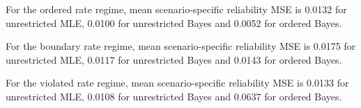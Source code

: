 For the ordered rate regime, mean scenario-specific reliability MSE is 0.0132 for unrestricted MLE, 0.0100 for unrestricted Bayes and 0.0052 for ordered Bayes.

For the boundary rate regime, mean scenario-specific reliability MSE is 0.0175 for unrestricted MLE, 0.0117 for unrestricted Bayes and 0.0143 for ordered Bayes.

For the violated rate regime, mean scenario-specific reliability MSE is 0.0133 for unrestricted MLE, 0.0108 for unrestricted Bayes and 0.0637 for ordered Bayes.
